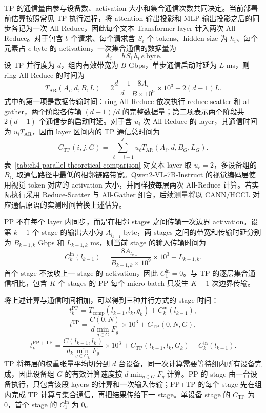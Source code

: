 TP 的通信量由参与设备数、activation 大小和集合通信次数共同决定。当前部署前估算按照常见 TP 执行过程，将 attention 输出投影和 MLP 输出投影之后的同步各记为一次 All-Reduce，因此每个文本 Transformer layer 计入两次 All-Reduce。对于包含 \(b\) 个请求、每个请求含 \(S_i\) 个 tokens、hidden size 为 \(h_i\)、每个元素占 \(e\) byte 的 activation，一次集合通信的数据量为
\[
A_i=b\,S_i\,h_i\,e\ \mathrm{byte}.
\]
设 TP 并行度为 \(d\)，组内有效带宽为 \(B\) Gbps，单步通信启动时延为 \(L\) ms，则 ring All-Reduce 的时间为
\[
T_{\mathrm{AR}}(A_i,d,B,L)=
2\frac{d-1}{d}\frac{8A_i}{B\times10^9}\times10^3
+2(d-1)L.
\]
式中的第一项是数据传输时间：ring All-Reduce 依次执行 reduce-scatter 和 all-gather，两个阶段各传输 \((d-1)/d\) 的完整数据量；第二项表示两个阶段共 \(2(d-1)\) 个通信步的启动时延。对于含 \(u_i\) 次 All-Reduce 的 layer，其通信时间为 \(u_iT_{\mathrm{AR}}\)，因而 layer 区间内的 TP 通信总时间为
\[
C_{\mathrm{TP}}(i,j,G)=
\sum_{\ell=i+1}^{j}u_{\ell}
T_{\mathrm{AR}}(A_{\ell},d,B_G,L_G).
\]
表~\ref{tab:ch4-parallel-theoretical-comparison} 对文本 layer 取 \(u_{\ell}=2\)，多设备组的 \(B_G\) 取通信路径中最低的相邻链路带宽。Qwen2-VL-7B-Instruct 的视觉编码层使用视觉 token 对应的 activation 大小，并同样按每层两次 All-Reduce 计算。若实际执行采用 Reduce-Scatter 与 All-Gather 组合，后续测量将以 CANN/HCCL 对应通信原语的实测时间替换上述估算。

PP 不在每个 layer 内同步，而是在相邻 stages 之间传输一次边界 activation。设第 \(k-1\) 个 stage 的输出大小为 \(A_{l_{k-1}}\) byte，两 stages 之间的带宽和传输时延分别为 \(B_{k-1,k}\) Gbps 和 \(L_{k-1,k}\) ms，则当前 stage 的输入传输时间为
\[
C_k^{\mathrm{in}}(l_{k-1})=
\frac{8A_{l_{k-1}}}{B_{k-1,k}\times10^9}\times10^3
+L_{k-1,k}.
\]
首个 stage 不接收上一 stage 的 activation，因此 \(C_1^{\mathrm{in}}=0\)。与 TP 的逐层集合通信相比，包含 \(K\) 个 stages 的 PP 每个 micro-batch 只发生 \(K-1\) 次边界传输。

将上述计算与通信时间相加，可以得到三种并行方式的 stage 时间：
\[
t_k^{\mathrm{PP}}=
T_{\mathrm{comp}}(l_{k-1},l_k,g_k)
+C_k^{\mathrm{in}}(l_{k-1}),
\]
\[
t^{\mathrm{TP}}=
\frac{C(0,N)}{d\min_{g\in G}F_g}\times10^3
+C_{\mathrm{TP}}(0,N,G),
\]
\[
t_k^{\mathrm{PP+TP}}=
\frac{C(l_{k-1},l_k)}{d_k\min_{g\in G_k}F_g}\times10^3
+C_{\mathrm{TP}}(l_{k-1},l_k,G_k)
+C_k^{\mathrm{in}}(l_{k-1}).
\]
TP 将每层的权重张量平均切分到 \(d\) 台设备，同一次计算需要等待组内所有设备完成，因此设备组 \(G\) 的有效计算速度按 \(d\min_{g\in G}F_g\) 计算。PP 的 stage 由一台设备执行，只包含该段 layers 的计算和一次输入传输；PP+TP 的每个 stage 先在组内完成 TP 计算与集合通信，再把结果传给下一 stage。单设备 stage 的 \(C_{\mathrm{TP}}\) 为 0，首个 stage 的 \(C_1^{\mathrm{in}}\) 为 0。


